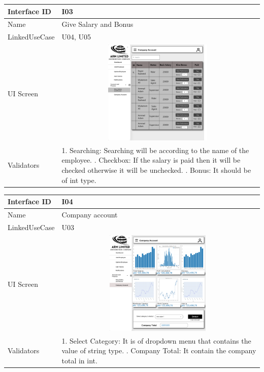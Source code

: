 \documentclass[12pt]{article}
\begin{document}
\begin{table}[H] 
\begin{tabular} {|m{6em}|m{12cm}|}
\hline
Interface ID & I03 \\ \hline
\newline
Name & Give Salary and Bonus\\ \hline
LinkedUseCase & U04, U05 \\ \hline
UI Screen &\newline \includegraphics [width=10cm, height=5cm] {r.png} \\ \hline
Validators &  1. Searching: Searching will be according to the name of the employee.
\newline
2. Checkbox: If the salary is paid then it will be checked otherwise it will be unchecked.
\newline
3. Bonus: It should be of int type.
\\ \hline
\end{tabular}
\end{table}
\begin{table}[H] 
\begin{tabular} {|m{6em}|m{12cm}|}
\hline
Interface ID & I04 \\ \hline
\newline
Name & Company account\\ \hline
LinkedUseCase & U03 \\ \hline
UI Screen &\newline \includegraphics [width=10cm, height=5cm] {4a.png} \\ \hline
Validators &  1. Select Category: It is of dropdown menu that contains the value of string type.
\newline
2. Company Total: It contain the company total in int.
\\ \hline
\end{tabular}
\end{table}
\end{document}
